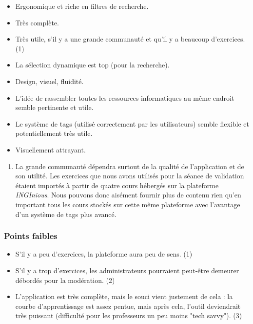 \begin{itemize}
    \item Ergonomique et riche en filtres de recherche.
    \item Très complète.
    \item Très utile, s'il y a une grande communauté et qu'il y a beaucoup d'exercices. (1)
    \item La sélection dynamique est top (pour la recherche).
    \item Design, visuel, fluidité.
    \item L'idée de rassembler toutes les ressources informatiques au même endroit semble pertinente et utile.
    \item Le système de tags (utilisé correctement par les utilisateurs) semble flexible et potentiellement très utile.
    \item Visuellement attrayant.
\end{itemize}
\bigskip
\begin{enumerate}
    \item La grande communauté dépendra surtout de la qualité de l'application et de son utilité. Les exercices que nous avons utilisés pour la séance de validation étaient importés à partir de quatre cours hébergés sur la plateforme \textit{INGInious}. Nous pouvons donc aisément fournir plus de contenu rien qu'en important tous les cours stockés sur cette même plateforme avec l'avantage d'un système de \glspl{tag} plus avancé.
\end{enumerate}

\subsubsection*{Points faibles}

\begin{itemize}
    \item S'il y a peu d'exercices, la plateforme aura peu de sens. (1)
    \item S'il y a trop d'exercices, les administrateurs pourraient peut-être demeurer débordés pour la modération. (2)
    \item L'application est très complète, mais le souci vient justement de cela : la courbe d'apprentissage est assez pentue, mais après cela, l'outil deviendrait très puissant (difficulté pour les professeurs un peu moins "tech savvy"). (3)
\end{itemize}

